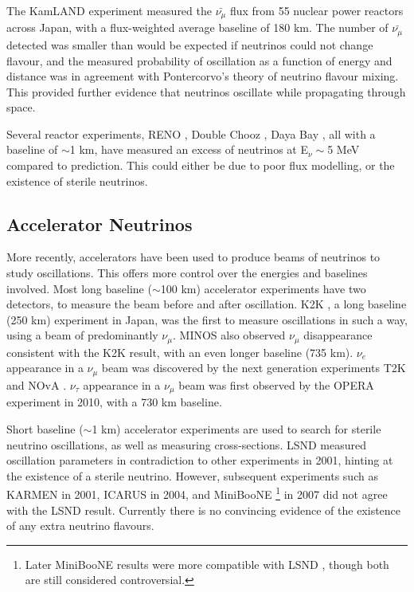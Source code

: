 The KamLAND experiment \cite{kamland} measured the $\bar{\nu_{\mu}}$ flux from 55 nuclear power reactors across Japan, with a flux-weighted average baseline of 180 km. The number of $\bar{\nu_{\mu}}$ detected was smaller than would be expected if neutrinos could not change flavour, and the measured probability of oscillation as a function of energy and distance was in agreement with Pontercorvo's theory of neutrino flavour mixing. This provided further evidence that neutrinos oscillate while propagating through space.

Several reactor experiments, RENO \cite{reno}, Double Chooz \cite{doublechooz}, Daya Bay \cite{dayabay}, all with a baseline of $\sim$1 km, have measured an excess of neutrinos at E$_\nu \sim$5 MeV compared to prediction. This could either be due to poor flux modelling, or the existence of sterile neutrinos.

\subsection{Accelerator Neutrinos}\label{sec:acceleratorneutrinos}

More recently, accelerators have been used to produce beams of neutrinos to study oscillations. This offers more control over the energies and baselines involved. Most long baseline ($\sim$100 km) accelerator experiments have two detectors, to measure the beam before and after oscillation. K2K \cite{k2k}, a long baseline (250 km) experiment in Japan, was the first to measure oscillations in such a way, using a beam of predominantly $\nu_\mu$. MINOS \cite{minos} also observed $\nu_\mu$ disappearance consistent with the K2K result, with an even longer baseline (735 km). $\nu_e$ appearance in a $\nu_\mu$ beam was discovered by the next generation experiments T2K and NOvA \cite{nova}. $\nu_\tau$ appearance in a $\nu_\mu$ beam was first observed by the OPERA\cite{opera} experiment in 2010, with a 730 km baseline. 

Short baseline ($\sim$1 km) accelerator experiments are used to search for sterile neutrino oscillations, as well as measuring cross-sections. LSND \cite{lsnd} measured oscillation parameters in contradiction to other experiments in 2001, hinting at the existence of a sterile neutrino. However, subsequent experiments such as KARMEN \cite{karmen} in 2001, ICARUS \cite{icarus} in 2004, and MiniBooNE \cite{miniboone1}\footnote{Later MiniBooNE results were more compatible with LSND \cite{miniboone2}, though both are still considered controversial.} in 2007 did not agree with the LSND result. Currently there is no convincing evidence of the existence of any extra neutrino flavours.

